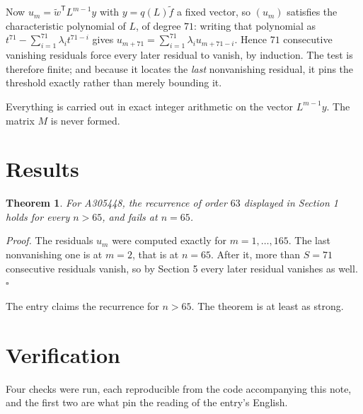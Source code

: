 \documentclass[11pt]{article}
\newtheorem{theorem}{Theorem}
\theoremstyle{definition}
\begin{document}
Now $u_m = \tilde w^{\mathsf T} L^{m-1} y$ with $y = q(L)\tilde f$ a fixed vector, so $(u_m)$ satisfies the characteristic polynomial of $L$, of degree $71$: writing that polynomial as $t^{71} - \sum_{i=1}^{71} \lambda_i t^{71-i}$ gives $u_{m+71} = \sum_{i=1}^{71} \lambda_i u_{m+71-i}$. Hence $71$ consecutive vanishing residuals force every later residual to vanish, by induction. The test is therefore finite; and because it locates the {\itshape last} nonvanishing residual, it pins the threshold exactly rather than merely bounding it.

Everything is carried out in exact integer arithmetic on the vector $L^{m-1}y$. The matrix $M$ is never formed.

\section{Results}

\begin{theorem} For A305448, the recurrence of order $63$ displayed in Section 1 holds for every $n > 65$, and fails at $n = 65$.\end{theorem}

{\itshape Proof.} The residuals $u_m$ were computed exactly for $m = 1,\dots,165$. The last nonvanishing one is at $m = 2$, that is at $n = 65$. After it, more than $S = 71$ consecutive residuals vanish, so by Section 5 every later residual vanishes as well. $\square$

The entry claims the recurrence for $n > 65$. The theorem is at least as strong.

\section{Verification}

Four checks were run, each reproducible from the code accompanying this note, and the first two are what pin the reading of the entry's English.
\end{document}
